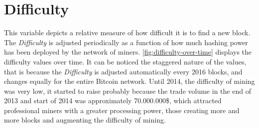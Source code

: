 


\section{Difficulty}
\label{sec:difficulty}


This variable depicts a relative measure of how difficult it is to
find a new block. The \textit{Difficulty} is adjusted periodically as
a function of how much hashing power has been deployed by the network
of miners. \autoref{fig:difficulty-over-time} displays the difficulty
values over time. It can be noticed the staggered nature of the
values, that is because the \textit{Difficulty} is adjusted
automatically every 2016 blocks, and changes equally for the entire
Bitcoin network. Until 2014, the difficulty of mining was very low, it
started to raise probably because the trade volume in the end of 2013
and start of 2014 was approximately 70.000.000\$, which attracted
professional miners with a greater processing power, those creating
more and more blocks and augmenting the difficulty of mining.

